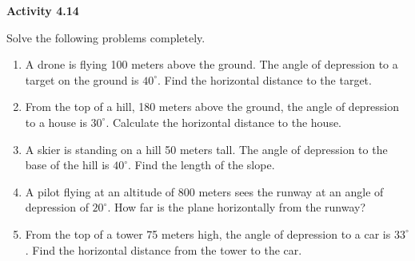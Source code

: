 \vspace{0.3ex}
\noindent\textbf{Activity 4.14}

\vspace{0.2ex}

Solve the following problems completely.

\begin{enumerate}





    \item A drone is flying 100 meters above the ground. The angle of depression to a target on the ground is \(40^\circ\). Find the horizontal distance to the target.

    \item From the top of a hill, 180 meters above the ground, the angle of depression to a house is \(30^\circ\). Calculate the horizontal distance to the house.

    \item A skier is standing on a hill 50 meters tall. The angle of depression to the base of the hill is \(40^\circ\). Find the length of the slope.

    \item A pilot flying at an altitude of 800 meters sees the runway at an angle of depression of \(20^\circ\). How far is the plane horizontally from the runway?

    \item From the top of a tower 75 meters high, the angle of depression to a car is \(33^\circ\). Find the horizontal distance from the tower to the car.
\end{enumerate}
